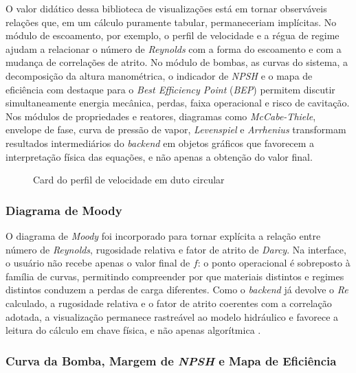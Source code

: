 O valor didático dessa biblioteca de visualizações está em tornar observáveis relações que, em um cálculo puramente tabular, permaneceriam implícitas. No módulo de escoamento, por exemplo, o perfil de velocidade e a régua de regime ajudam a relacionar o número de \textit{Reynolds} com a forma do escoamento e com a mudança de correlações de atrito. No módulo de bombas, as curvas do sistema, a decomposição da altura manométrica, o indicador de \textit{NPSH} e o mapa de eficiência com destaque para o \textit{Best Efficiency Point} (\textit{BEP}) permitem discutir simultaneamente energia mecânica, perdas, faixa operacional e risco de cavitação. Nos módulos de propriedades e reatores, diagramas como \textit{McCabe-Thiele}, envelope de fase, curva de pressão de vapor, \textit{Levenspiel} e \textit{Arrhenius} transformam resultados intermediários do \textit{backend} em objetos gráficos que favorecem a interpretação física das equações, e não apenas a obtenção do valor final.

\begin{figure}[H]
    \centering
    \caption{Card do perfil de velocidade em duto circular}
    \label{fig:viz_perfil_velocidade}
\end{figure}

\subsubsection{Diagrama de Moody}

O diagrama de \textit{Moody} foi incorporado para tornar explícita a relação entre número de \textit{Reynolds}, rugosidade relativa e fator de atrito de \textit{Darcy}. Na interface, o usuário não recebe apenas o valor final de $f$: o ponto operacional é sobreposto à família de curvas, permitindo compreender por que materiais distintos e regimes distintos conduzem a perdas de carga diferentes. Como o \textit{backend} já devolve o \textit{Re} calculado, a rugosidade relativa e o fator de atrito coerentes com a correlação adotada, a visualização permanece rastreável ao modelo hidráulico e favorece a leitura do cálculo em chave física, e não apenas algorítmica \cite{white2018,colebrook1939,swamee1976,haaland1983}.

\subsubsection{Curva da Bomba, Margem de \textit{NPSH} e Mapa de Eficiência}

